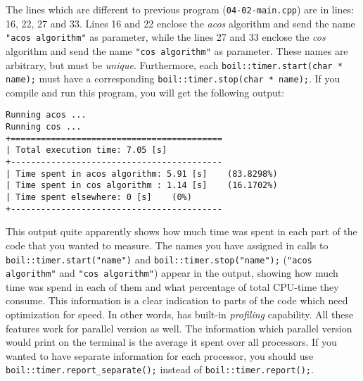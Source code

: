 %
The lines which are different to previous program ({\tt 04-02-main.cpp}) are
in lines: 16, 22, 27 and 33. Lines 16 and 22 enclose the {\em acos} algorithm
and send the name {\tt "acos algorithm"} as parameter, while the lines 27
and 33 enclose the {\em cos} algorithm and send the name {\tt "cos algorithm"}
as parameter. These names are arbitrary, but must be {\em unique}. Furthermore,
each {\tt boil::timer.start(char * name);} must have a corresponding 
{\tt boil::timer.stop(char * name);}. If you compile and run this program, you will
get the following output:
%
{\small \begin{verbatim}
Running acos ...
Running cos ...
+==========================================
| Total execution time: 7.05 [s]
+------------------------------------------
| Time spent in acos algorithm: 5.91 [s]    (83.8298%)
| Time spent in cos algorithm : 1.14 [s]    (16.1702%)
| Time spent elsewhere: 0 [s]    (0%)
+------------------------------------------
\end{verbatim}}
%
This output quite apparently shows how much time was spent in each part of
the code that you wanted to measure. The names you have assigned in calls
to {\tt boil::timer.start("name")} and {\tt boil::timer.stop("name");}
({\tt "acos algorithm"} and {\tt "cos algorithm"}) appear in the output,
showing how much time was spend in each of them and what percentage of
total CPU-time they consume. This information is a clear indication 
to parts of the code which need optimization for speed. In other words, 
{\psiboil} has built-in {\em profiling} capability. All these features work
for parallel version as well. The information which parallel version would
print on the terminal is the average it spent over all processors. If you
wanted to have separate information for each processor, you should
use {\tt boil::timer.report\_separate();} instead of 
{\tt boil::timer.report();}.

